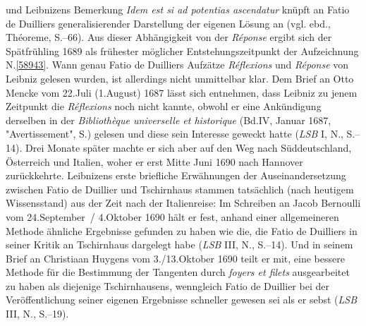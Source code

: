und Leibnizens Bemerkung \textit{Idem est si ad potentias ascendatur} knüpft an Fatio de Duilliers generalisierender Darstellung der eigenen Lösung an (vgl. ebd., Théoreme, S.--66).\cite{02540}
Aus dieser Abhängigkeit von der \textit{Réponse}\cite{02540} ergibt sich der Spätfrühling 1689 als frühester möglicher Entstehungszeitpunkt der Aufzeichnung N.\;\ref{58943}.
\pend%
\pstart%
Wann genau Fatio de Duilliers Aufzätze \textit{Réflexions}\cite{02539} und \textit{Réponse}\cite{02540} von Leibniz gelesen wurden, ist allerdings nicht unmittelbar klar.
Dem Brief an Otto Mencke vom 22.\;Juli (1.\;August) 1687 lässt sich entnehmen, dass Leibniz zu jenem Zeitpunkt die \textit{Réflexions}\cite{02539} noch nicht kannte, obwohl er eine Ankündigung derselben in der \textit{Bibliothèque universelle et historique} (Bd.\;IV, Januar 1687, "Avertissement", S.\;)\cite{02545} gelesen und diese sein Interesse geweckt hatte (\textit{LSB} I, N., S.--14).\cite{02544}
Drei Monate später machte er sich aber auf den Weg nach Süddeutschland, Österreich und Italien, woher er erst Mitte Juni 1690 nach Hannover zurückkehrte.
Leibnizens erste briefliche Erwähnungen der Auseinandersetzung zwischen Fatio de Duillier und Tschirnhaus stammen tatsächlich (nach heutigem Wissensstand) aus der Zeit nach der Italienreise:
Im Schreiben an Jacob Bernoulli vom 24.\;September~/ 4.\;Oktober 1690 hält er fest, %
anhand einer allgemeineren Methode ähnliche Ergebnisse gefunden zu haben wie die, die Fatio de Duilliers in seiner Kritik an Tschirnhaus dargelegt habe (\textit{LSB} III, N., S.--14).\cite{01260}
Und in seinem Brief an Christiaan Huygens vom 3./13.\;Oktober 1690 teilt er mit, eine bessere Methode für die Bestimmung der Tangenten durch \textit{foyers et filets} ausgearbeitet zu haben als diejenige Tschirnhausens, wenngleich Fatio de Duillier bei der Veröffentlichung seiner eigenen Ergebnisse schneller gewesen sei als er sebst (\textit{LSB} III, N., S.--19).\cite{01506}
